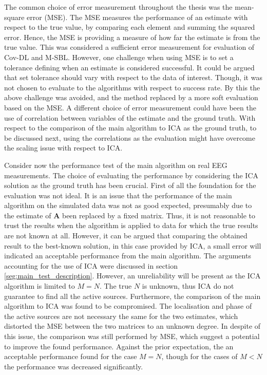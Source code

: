 The common choice of error measurement throughout the thesis was the mean-square error (MSE). The MSE measures the performance of an estimate with respect to the true value, by comparing each element and summing the squared error. Hence, the MSE is providing a measure of how far the estimate is from the true value. This was considered a sufficient error measurement for evaluation of Cov-DL and M-SBL.
However, one challenge when using MSE is to set a tolerance defining when an estimate is considered successful. It could be argued that set tolerance should vary with respect to the data of interest.
Though, it was not chosen to evaluate to the algorithms with respect to success rate. By this the above challenge was avoided, and the method replaced by a more soft evaluation based on the MSE. 
A different choice of error measurement could have been the use of correlation between variables of the estimate and the ground truth. With respect to the comparison of the main algorithm to ICA as the ground truth, to be discussed next, using the correlations as the evaluation might have overcome the scaling issue with respect to ICA.    

Consider now the performance test of the main algorithm on real EEG measurements. The choice of evaluating the performance by considering the ICA solution as the ground truth has been crucial. 
First of all the foundation for the evaluation was not ideal. 
It is an issue that the performance of the main algorithm on the simulated data was not as good expected, presumably due to the estimate of $\textbf{A}$ been replaced by a fixed matrix. 
Thus, it is not reasonable to trust the results when the algorithm is applied to data for which the true results are not known at all. 
However, it can be argued that comparing the obtained result to the best-known solution, in this case provided by ICA, a small error will indicated an acceptable performance from the main algorithm. 
The arguments accounting for the use of ICA were discussed in section \ref{seg:main_test_description}. However, an unreliability will be present as the ICA algorithm is limited to $M = N$. The true $N$ is unknown, thus ICA do not guarantee to find all the active sources.
Furthermore, the comparison of the main algorithm to ICA was found to be compromised. The localisation and phase of the active sources are not necessary the same for the two estimates, which distorted the MSE between the two matrices to an unknown degree.
In despite of this issue, the comparison was still performed by MSE, which suggest a potential to improve the found performance. Against the prior expectation, the an acceptable performance found for the case $M=N$, though for the cases of $M<N$ the performance was decreased significantly.    

